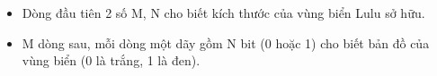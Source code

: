 \begin{itemize}
	\item     Dòng đầu tiên 2 số M, N cho biết kích thước của vùng biển Lulu sở hữu.   
	\item     M dòng sau, mỗi dòng một dãy gồm N bit (0 hoặc 1) cho biết bản đồ của vùng biển (0 là trắng, 1 là đen).   
\end{itemize}